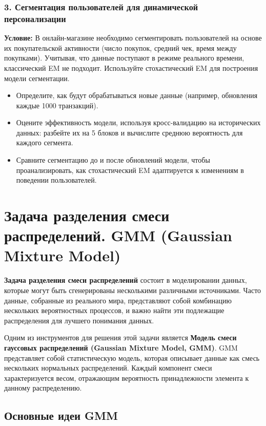 \subsubsection*{3. Сегментация пользователей для динамической персонализации}
\textbf{Условие:} В онлайн-магазине необходимо сегментировать пользователей на основе их покупательской активности (число покупок, средний чек, время между покупками). Учитывая, что данные поступают в режиме реального времени, классический EM не подходит. Используйте стохастический EM для построения модели сегментации.
\begin{itemize}
\item Определите, как будут обрабатываться новые данные (например, обновления каждые 1000 транзакций).
\item Оцените эффективность модели, используя кросс-валидацию на исторических данных: разбейте их на 5 блоков и вычислите среднюю вероятность для каждого сегмента.
\item Сравните сегментацию до и после обновлений модели, чтобы проанализировать, как стохастический EM адаптируется к изменениям в поведении пользователей.
\end{itemize}


\section{Задача разделения смеси распределений. GMM (Gaussian Mixture Model)}

\textbf{Задача разделения смеси распределений} состоит в моделировании данных, которые могут быть сгенерированы несколькими различными источниками. Часто данные, собранные из реального мира, представляют собой комбинацию нескольких вероятностных процессов, и важно найти эти подлежащие распределения для лучшего понимания данных.

Одним из инструментов для решения этой задачи является \textbf{Модель смеси гауссовых распределений (Gaussian Mixture Model, GMM)}. GMM представляет собой статистическую модель, которая описывает данные как смесь нескольких нормальных распределений. Каждый компонент смеси характеризуется весом, отражающим вероятность принадлежности элемента к данному распределению.

\subsection{Основные идеи  GMM}

